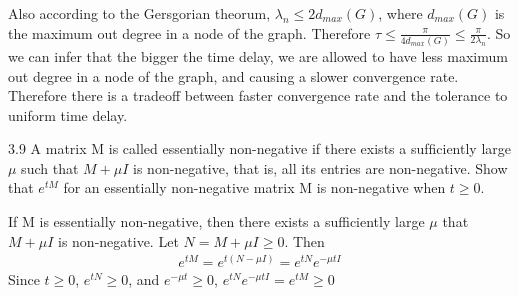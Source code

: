 \documentclass{article}
\begin{document}
\begin{problem}
    Also according to the Gersgorian theorum, $\lambda_n \leq 2 d_{max}(G)$, where $d_{max}(G)$ is the maximum out degree in a node of the graph. Therefore  $\tau \leq \frac{\pi}{4 d_{max}(G)}\leq \frac{\pi}{2\lambda_n}$. So we can infer that the bigger the time delay, we are allowed to have less maximum out degree in a node of the graph, and causing a slower convergence rate. Therefore there is a tradeoff between faster convergence rate and the tolerance to uniform time delay. 
\end{problem}
\begin{problem} 3.9
    A matrix M is called essentially non-negative if there exists a sufﬁciently large $\mu$ such that $M + \mu I$ is non-negative, that is, all its entries are non-negative. Show that $e^{tM}$ for an essentially non-negative matrix M is non-negative when $t \geq 0.$

    If M is essentially non-negative, then there exists a sufficiently large $\mu$ that $M + \mu I$ is non-negative. Let $N = M + \mu I \geq 0$. Then 
    \begin{align*}
        e^{tM} = e^{t(N - \mu I)} = e^{tN}e^{-\mu  tI}
    \end{align*}
    Since $t \geq 0$, $e^{tN} \geq 0$, and $e^{-\mu t} \geq 0$, $e^{tN}e^{-\mu t I} = e^{tM} \geq 0$
\end{problem}
\end{document}
